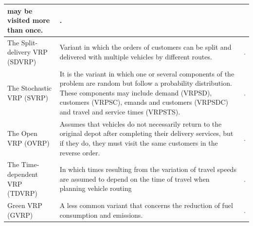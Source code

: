 \begin{longtable}[c]{|>{\raggedright}p{}|p{}|p{}|}
    may be visited more than once. & \cite{campbell2014forty}.\\
 \hline
 The Split-delivery VRP (SDVRP)  & Variant in which the orders of customers can be split and delivered with multiple vehicles by different routes. & \cite{silva2015iterated}.\\
 \hline
 The Stochastic VRP (SVRP)  &  It is the variant in which one or several
components of the problem are random but follow a probability
distribution. These components may include demand (VRPSD), customers (VRPSC), emands and customers (VRPSDC) and travel and service times (VRPSTS). & \cite{marinaki2016glowworm, miranda2016vehicle}.\\
 \hline
 The Open VRP (OVRP) & Assumes that vehicles do not necessarily return to the original depot after completing their delivery services, but if they do, they must visit the same customers in the reverse order. & \cite{marinakis2014bumble}.\\
 \hline
 The Time-dependent VRP (TDVRP) & In which times resulting from the variation of travel speeds are assumed to depend on the time of travel when planning vehicle routing & \cite{franceschetti2017metaheuristic}.\\
 \hline
 Green VRP (GVRP)  & A less common variant that concerns the reduction of fuel consumption and emissions. & \cite{lin2014survey}.\\
 \hline
 \end{longtable}